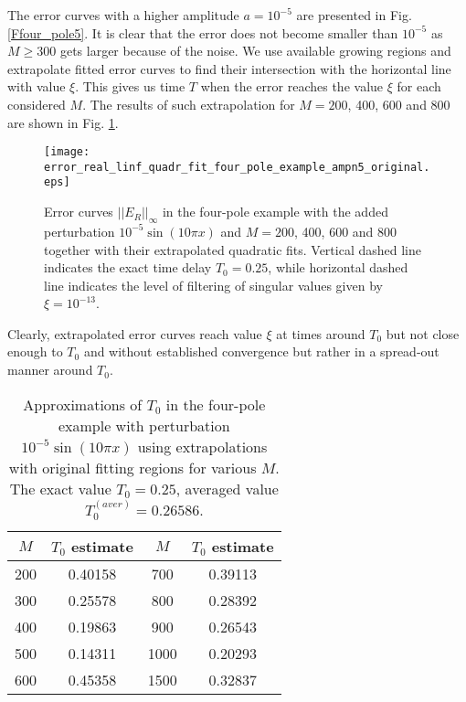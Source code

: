 \documentclass[journal,twoside]{IEEEtran}
\begin{document}
The error curves with a higher amplitude $a=10^{-5}$ are presented in Fig. \ref{Ffour_pole5}. It is clear that the error does not become smaller than $10^{-5}$ as $M\geq 300$ gets larger because of the noise. We use available  growing regions and extrapolate fitted error curves to find their intersection with the horizontal line with value $\xi$. This gives us time $T$ when the error reaches the value $\xi$ for each considered $M$. The results of such extrapolation for $M=200$, 400, 600 and 800 are shown in Fig. \ref{Ffour_pole6}.
\begin{figure}[h] \begin{center}
\texttt{[image: error\_real\_linf\_quadr\_fit\_four\_pole\_example\_ampn5\_original.eps]}
\end{center}
\caption{Error curves $||E_R||_\infty$ in the four-pole example  with  the added perturbation $10^{-5}\sin(10\pi x)$  and $M=200$, 400, 600 and 800  together with their extrapolated quadratic fits. Vertical dashed line indicates the exact time delay $T_0=0.25$, while horizontal dashed line indicates the level of filtering of singular values given by $\xi=10^{-13}$.}
\label{Ffour_pole6}
\end{figure}
Clearly, extrapolated error curves reach value $\xi$ at times around $T_0$ but not close enough to $T_0$ and without established convergence but rather in a spread-out manner around $T_0$.
\begin{table}[h]
\begin{center}
\begin{tabular}{|c|c||c|c|}
\hline
\rule{0cm}{10pt}
$M$ & $T_0$ estimate & $M$ & $T_0$ estimate \\[3pt]
\hline
\rule{0cm}{10pt}
  200 &    0.40158 & 700  & 0.39113 \\[3pt]
\hline
\rule{0cm}{10pt}  
  300 &  0.25578  &   800  &  0.28392 \\[3pt]
\hline
\rule{0cm}{10pt}  
400  &  0.19863 & 900  & 0.26543 \\[3pt] 
\hline
\rule{0cm}{10pt}    
500  &  0.14311 & 1000  &  0.20293 \\
\hline
\rule{0cm}{10pt}    
600  &  0.45358 & 1500  &  0.32837 \\
\hline
\end{tabular}
\end{center}
\caption{Approximations of $T_0$ in the four-pole example with perturbation  $10^{-5}\sin(10\pi x)$ using extrapolations with original fitting regions for various $M$. The exact value $T_0=0.25$, averaged value $T_0^{(aver)}=0.26586$.}
\label{T0approx_ampn5_table}
\end{table} 
\end{document}
